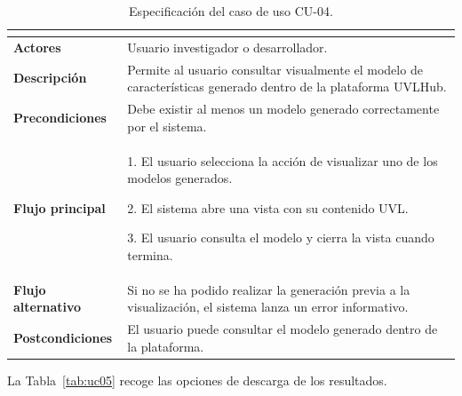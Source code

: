 \begin{table}[H]
\centering
\small
\renewcommand{\arraystretch}{1.35}
\begin{tabular}{@{}>{\bfseries\RaggedRight\arraybackslash}p{4cm} P{10cm}@{}}
\toprule
{} \\
\midrule

Actores &
Usuario investigador o desarrollador. \\

Descripción &
Permite al usuario consultar visualmente el modelo de características generado dentro de la plataforma UVLHub. \\

Precondiciones &
Debe existir al menos un modelo generado correctamente por el sistema. \\

Flujo principal &
1. El usuario selecciona la acción de visualizar uno de los
modelos generados.

2. El sistema abre una vista con su contenido UVL.

3. El usuario consulta el modelo y cierra la vista cuando termina. \\

Flujo alternativo &
Si no se ha podido realizar la generación previa a la visualización, el sistema lanza un error informativo. \\

Postcondiciones &
El usuario puede consultar el modelo generado dentro de la plataforma. \\

\bottomrule
\end{tabular}
\caption{Especificación del caso de uso CU-04.}
\label{tab:uc04}
\end{table}

La Tabla~\ref{tab:uc05} recoge las opciones de descarga de los resultados.


